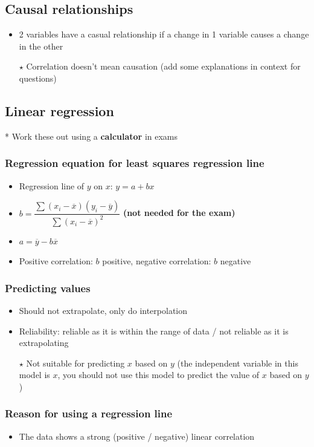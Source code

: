 \documentclass[fleqn, 11pt]{article}
\begin{document}
	\subsection{Causal relationships}
	\begin{itemize}
		\item 2 variables have a casual relationship if a change in 1 variable causes a change in the other
		\item[$\star$] Correlation doesn't mean causation (add some explanations in context for questions)
	\end{itemize}
	
	\subsection{Linear regression}
	* Work these out using a \textbf{calculator} in exams
	\subsubsection{Regression equation for least squares regression line}
	\begin{itemize}
		\item Regression line of $y$ on $x$: $y=a+bx$
		\item $b=\dfrac{\sum (x_i-\overline{x}) (y_i-\overline{y})}{\sum (x_i-\overline{x})^2}$ \textbf{(not needed for the exam)}
		\item $a=\overline{y}-b\overline{x}$
		\item Positive correlation: $b$ positive, negative correlation: $b$ negative
	\end{itemize}
	
	\subsubsection{Predicting values}
	\begin{itemize}
		\item Should not extrapolate, only do interpolation
		\item Reliability: reliable as it is within the range of data / not reliable as it is extrapolating
		\item[$\star$] Not suitable for predicting $x$ based on $y$ (the independent variable in this model is $x$, you should not use this model to predict the value of $x$ based on $y$)
	\end{itemize}
	
	\subsubsection{Reason for using a regression line}
	\begin{itemize}
		\item The data shows a strong (positive / negative) linear correlation
	\end{itemize}
	
\end{document}
